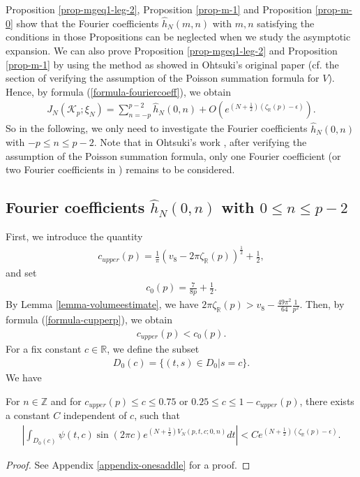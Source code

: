 \documentclass[12pt]{amsart}
\begin{document}
\begin{remark}
    Proposition \ref{prop-mgeq1-leg-2}, Proposition \ref{prop-m-1} and Proposition \ref{prop-m-0} show that the Fourier coefficients $\hat{h}_{N}(m,n)$  with $m,n$ satisfying the conditions in those Propositions can be neglected when we study the asymptotic expansion.  We can also prove Proposition \ref{prop-mgeq1-leg-2} and Proposition \ref{prop-m-1}  by using the method as showed in Ohtsuki's original paper \cite{Oht16,Oht18} (cf. the section of verifying the assumption of the Poisson summation formula for $V$).  
Hence, by formula (\ref{formula-fouriercoeff}), we obtain 
\begin{align} \label{formula-Poission-after}
      J_N(\mathcal{K}_p;\xi_N)=\sum_{n=-p}^{p-2}\hat{h}_{N}(0,n)+O\left(e^{(N+\frac{1}{2})\left(\zeta_{\mathbb{R}}(p)-\epsilon\right)}\right).
\end{align}
So in the following, we only need to investigate the Fourier coefficients $\hat{h}_N(0,n)$ with $-p\leq n\leq p-2$. Note that in Ohtsuki's work \cite{Oht16,Oht17,OhtYok18,Oht18}, after verifying the assumption of the Poisson summation formula,  only one Fourier coefficient (or two Fourier coefficients in \cite{Oht18}) remains to be considered. 
\end{remark}



\subsection{Fourier coefficients $\hat{h}_N(0,n)$ with $0\leq n\leq p-2$} \label{subsection-m=0np}
First, we introduce the quantity
\begin{align} \label{formula-cupperp}
    c_{upper}(p)=\frac{1}{\pi}(v_8-2\pi\zeta_{\mathbb{R}}(p))^{\frac{1}{2}}+\frac{1}{2},
\end{align}
and set
\begin{align}
    c_{0}(p)=\frac{7}{8p}+\frac{1}{2}.
\end{align}
By Lemma \ref{lemma-volumeestimate},  we have $2\pi\zeta_{\mathbb{R}}(p)>v_{8}-\frac{49\pi^2}{64}\frac{1}{p^2}$. Then, by formula (\ref{formula-cupperp}), we obtain 
\begin{align}  \label{formula-cupper<c0}
    c_{upper}(p)<c_0(p).
\end{align} 
For a fix constant $c\in \mathbb{R}$, we define the subset 
\begin{align}
    D_0(c)=\{(t,s)\in D_0| s=c\}.
\end{align}
We have
\begin{proposition} \label{prop-saddleonedim}
  For $n\in \mathbb{Z}$ and for $c_{upper}(p)\leq c\leq 0.75$ or $0.25\leq c\leq 1-c_{upper}(p)$, there exists a constant $C$ independent of $c$, such that
    \begin{align}
        |\int_{D_0(c)}\psi(t,c) \sin(2\pi c)e^{(N+\frac{1}{2})V_N(p,t,c;0,n)}dt|<Ce^{(N+\frac{1}{2})\left(\zeta_{\mathbb{R}}(p)-\epsilon\right)}. 
    \end{align}
\end{proposition}
\begin{proof}
    See Appendix \ref{appendix-onesaddle} for a proof. 
\end{proof}
\end{document}
